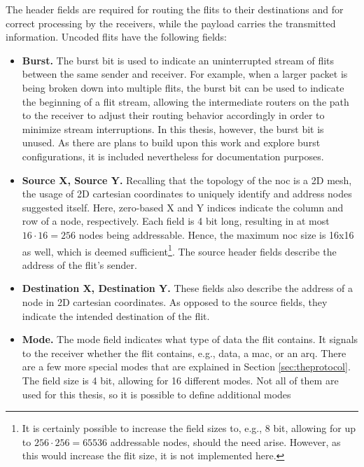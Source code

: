 The header fields are required for routing the flits to their destinations and for correct processing by the receivers, while the payload carries the
transmitted information. Uncoded flits have the following fields:
\begin{itemize}
    \item \textbf{Burst.} The burst bit is used to indicate an uninterrupted stream of flits between the same sender and receiver. For example, when a
        larger packet is being broken down into multiple flits, the burst bit can be used to indicate the beginning of a flit stream, allowing the
        intermediate routers on the path to the receiver to adjust their routing behavior accordingly in order to minimize stream interruptions. In
        this thesis, however, the burst bit is unused. As there are plans to build upon this work and explore burst configurations, it is included
        nevertheless for documentation purposes.
    \item \textbf{Source X, Source Y.} Recalling that the topology of the \gls{noc} is a 2D mesh, the usage of 2D cartesian coordinates to uniquely
        identify and address nodes suggested itself. Here, zero-based X and Y indices indicate the column and row of a node, respectively. Each field is 4 bit long,
        resulting in at most $16 \cdot 16 = 256$ nodes being addressable. Hence, the maximum \gls{noc} size is 16x16 as well, which is deemed
        sufficient\footnote{It is certainly possible to increase the field sizes to, e.g., 8 bit, allowing for up to $256 \cdot 256 = 65536$ addressable
        nodes, should the need arise. However, as this would increase the flit size, it is not implemented here.}. The source header fields describe
        the address of the flit's sender.%
    \item \textbf{Destination X, Destination Y.} These fields also describe the address of a node in 2D cartesian coordinates. As opposed to the
        source fields, they indicate the intended destination of the flit.
    \item \textbf{Mode.} The mode field indicates what type of data the flit contains. It signals to the receiver whether the flit contains, e.g.,
        data, a \gls{mac}, or an \gls{arq}. There are a few more special modes that are explained in Section \ref{sec:theprotocol}. The
        field size is 4 bit, allowing for 16 different modes. Not all of them are used for this thesis, so it is possible to define additional modes

\end{itemize}
